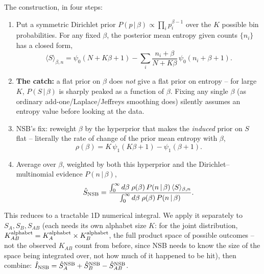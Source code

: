 \documentclass[11pt]{article}
\begin{document}
The construction, in four steps:

\begin{enumerate}
\item Put a symmetric Dirichlet prior $P(p\,|\,\beta)\propto\prod_i
p_i^{\beta-1}$ over the $K$ possible bin probabilities. For any fixed
$\beta$, the posterior mean entropy given counts $\{n_i\}$ has a closed
form,
\begin{equation}
\langle S\rangle_{\beta,n} = \psi_0(N+K\beta+1) -
\sum_i \frac{n_i+\beta}{N+K\beta}\,\psi_0(n_i+\beta+1).
\end{equation}

\item \textbf{The catch:} a flat prior on $\beta$ does \emph{not} give a
flat prior on entropy -- for large $K$, $P(S\,|\,\beta)$ is sharply peaked
as a function of $\beta$. Fixing any single $\beta$ (as ordinary
add-one/Laplace/Jeffreys smoothing does) silently assumes an entropy value
before looking at the data.

\item NSB's fix: reweight $\beta$ by the hyperprior that makes the
\emph{induced} prior on $S$ flat -- literally the rate of change of the
prior mean entropy with $\beta$,
\begin{equation}
\rho(\beta) = K\,\psi_1(K\beta+1) - \psi_1(\beta+1).
\end{equation}

\item Average over $\beta$, weighted by both this hyperprior and the
Dirichlet--multinomial evidence $P(n\,|\,\beta)$,
\begin{equation}
\hat S_{\rm NSB} =
\frac{\int_0^\infty d\beta\;\rho(\beta)\,P(n\,|\,\beta)\,\langle
S\rangle_{\beta,n}}
{\int_0^\infty d\beta\;\rho(\beta)\,P(n\,|\,\beta)}.
\end{equation}
\end{enumerate}

This reduces to a tractable 1D numerical integral. We apply it separately
to $S_A,S_B,S_{AB}$ (each needs its own alphabet size $K$: for the joint
distribution, $K_{AB}^{\rm alphabet}=K_A^{\rm alphabet}\times K_B^{\rm
alphabet}$, the full product space of possible outcomes -- not the
observed $K_{AB}$ count from before, since NSB needs to know the size of
the space being integrated over, not how much of it happened to be hit),
then combine: $\hat I_{\rm NSB} = \hat S_A^{\rm NSB}+\hat S_B^{\rm
NSB}-\hat S_{AB}^{\rm NSB}$.
\end{document}
